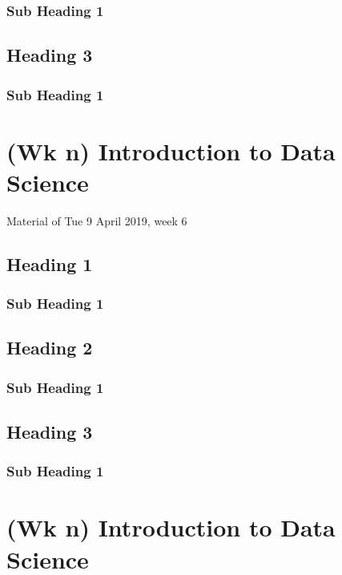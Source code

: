 \documentclass[]{book}
\begin{document}
\subsection{Sub Heading 1}\label{sub-heading-1-10}

\section{Heading 3}\label{heading-3-3}

\subsection{Sub Heading 1}\label{sub-heading-1-11}

\chapter{(Wk n) Introduction to Data
Science}\label{wk-n-introduction-to-data-science}

Material of Tue 9 April 2019, week 6

\section{Heading 1}\label{heading-1-4}

\subsection{Sub Heading 1}\label{sub-heading-1-12}

\section{Heading 2}\label{heading-2-4}

\subsection{Sub Heading 1}\label{sub-heading-1-13}

\section{Heading 3}\label{heading-3-4}

\subsection{Sub Heading 1}\label{sub-heading-1-14}

\chapter{(Wk n) Introduction to Data
Science}\label{wk-n-introduction-to-data-science-1}
\end{document}
